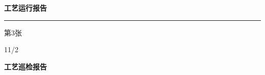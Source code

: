 \documentclass[UTF8,10pt,a4paper,fontset=fandol]{ctexart}
\newcommand{\handwritten}[1]{#1}
\begin{document}
\begin{minipage}[t]{0.47\textwidth}
\centering
\textbf{工艺运行报告}

\vspace{0.3em}
\noindent\rule{\linewidth}{0.4pt}

\vspace{0.6em}

\vspace{0.3em}
第3张
\end{minipage}

\hfill
\begin{minipage}[t]{0.47\textwidth}
\vspace{6.5cm}
\begin{flushright}
\handwritten{11/2}
\end{flushright}
\end{minipage}

\newpage

\begin{center}
\textbf{工艺巡检报告}
\end{center}

\end{document}
